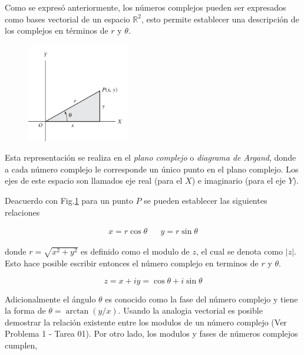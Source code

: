         Como se expresó anteriormente, los números complejos pueden ser expresados como bases vectorial de un espacio $\mathbb{R}^2$, esto permite establecer una descripción de los complejos en términos de $r$ y $\theta$.

        \begin{figure}
            \centering
            \includegraphics[width=0.4\textwidth]{imgs/ipolar.png}
            \caption{}
            \label{fig:ipl}
        \end{figure}
        Esta representación se realiza en el \textit{plano complejo} o \textit{diagrama de Argand}, donde a cada número complejo le corresponde un único punto en el plano complejo. Los ejes de este espacio son llamados eje real (para el $X$) e imaginario (para el eje $Y$).
        \vspace{0.5cm}

        Deacuerdo con Fig.\ref*{fig:ipl} para un punto $P$ se pueden establecer las siguientes relaciones

        \begin{align*}
            x = r\cos\theta &  & y = r\sin\theta
        \end{align*}

        donde $r = \sqrt{x^2 + y^2}$ es definido como el modulo de $z$, el cual se denota como $|z|$. Esto hace posible escribir entonces el número complejo en terminos de $r$ y $\theta$.

        \begin{equation*}
            z = x + iy = \cos\theta + i\sin\theta
        \end{equation*}

        Adicionalmente el ángulo $\theta$ es conocido como la fase del número complejo y tiene la forma de $\theta = \arctan(y/x)$. Usando la analogia vectorial es posible demostrar la relación existente entre los modulos de un número complejo (Ver Problema 1 - Tarea 01). Por otro lado, los modulos y fases de números complejos cumplen,
        
